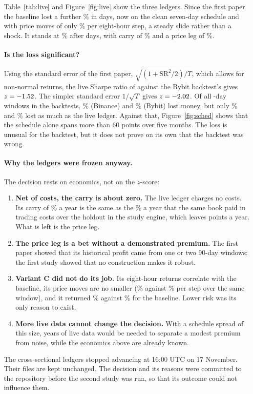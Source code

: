 \documentclass[11pt,a4paper]{article}
\begin{document}
Table~\ref{tab:live} and Figure~\ref{fig:live} show the three ledgers. Since the first
paper the baseline lost a further \LiveSinceFirst\% in \LiveSinceFirstDays{} days, now
on the clean seven-day schedule and with price moves of only \LiveStepVol\% per
eight-hour step, a steady slide rather than a shock. It stands at \LiveTotal\% after
\LiveDays{} days, with carry of \LiveCarry\% and a price leg of \LivePrice\%.

\paragraph{Is the loss significant?} Using the standard error of the first paper,
$\sqrt{(1+\mathrm{SR}^2/2)/T}$, which allows for non-normal returns, the live Sharpe
ratio of \LiveSharpe{} against the Bybit backtest's \ByBaseSharpe{} gives
$z=-1.52$. The simpler standard error $1/\sqrt{T}$ gives $z=-2.02$. Of all
\LiveDays-day windows in the backtests, \BnWinNeg\% (Binance) and \ByWinNeg\% (Bybit)
lost money, but only \BnWinWorse\% and \ByWinWorse\% lost as much as the live ledger.
Against that, Figure~\ref{fig:sched} shows that the schedule alone spans more than 60
points over five months. The loss is unusual for the backtest, but it does not prove
on its own that the backtest was wrong.

\paragraph{Why the ledgers were frozen anyway.} The decision rests on economics, not on
the $z$-score:
\begin{enumerate}
  \item \textbf{Net of costs, the carry is about zero.} The live ledger charges no
  costs. Its carry of \LiveCarryAnn\% a year is the same as the \HoldBaseCost\% a year
  that the same book paid in trading costs over the holdout in the study engine, which
  leaves \LiveNetCarry{} points a year. What is left is the price leg.
  \item \textbf{The price leg is a bet without a demonstrated premium.} The first paper
  showed that its historical profit came from one or two 90-day windows; the first
  study showed that no construction makes it robust.
  \item \textbf{Variant C did not do its job.} Its eight-hour returns correlate
  \CCorr{} with the baseline, its price moves are no smaller (\CVol\% against
  \CBaseVol\% per step over the same window), and it returned \CTotal\% against
  \BaseSameWindow\% for the baseline. Lower risk was its only reason to exist.
  \item \textbf{More live data cannot change the decision.} With a schedule spread
  of this size, years of live data would be needed to separate a modest premium from
  noise, while the economics above are already known.
\end{enumerate}
The cross-sectional ledgers stopped advancing at 16:00 UTC on 17 November. Their files
are kept unchanged. The decision and its reasons were committed to the repository
before the second study was run, so that its outcome could not influence them.
\end{document}
